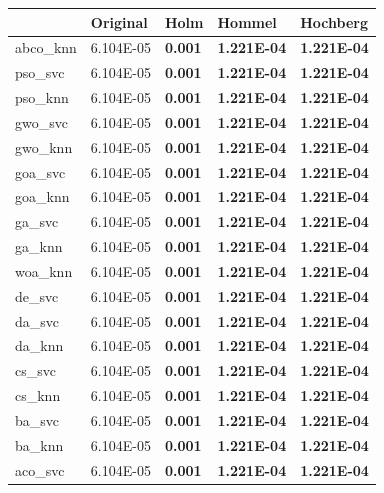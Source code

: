 \begin{table}[htb]
    \centering
    \begin{tabular}{lllll}
        \toprule
        {}        & Original  & Holm           & Hommel             & Hochberg           \\
        \midrule
        abco\_knn & 6.104E-05 & \textbf{0.001} & \textbf{1.221E-04} & \textbf{1.221E-04} \\
        pso\_svc  & 6.104E-05 & \textbf{0.001} & \textbf{1.221E-04} & \textbf{1.221E-04} \\
        pso\_knn  & 6.104E-05 & \textbf{0.001} & \textbf{1.221E-04} & \textbf{1.221E-04} \\
        gwo\_svc  & 6.104E-05 & \textbf{0.001} & \textbf{1.221E-04} & \textbf{1.221E-04} \\
        gwo\_knn  & 6.104E-05 & \textbf{0.001} & \textbf{1.221E-04} & \textbf{1.221E-04} \\
        goa\_svc  & 6.104E-05 & \textbf{0.001} & \textbf{1.221E-04} & \textbf{1.221E-04} \\
        goa\_knn  & 6.104E-05 & \textbf{0.001} & \textbf{1.221E-04} & \textbf{1.221E-04} \\
        ga\_svc   & 6.104E-05 & \textbf{0.001} & \textbf{1.221E-04} & \textbf{1.221E-04} \\
        ga\_knn   & 6.104E-05 & \textbf{0.001} & \textbf{1.221E-04} & \textbf{1.221E-04} \\
        woa\_knn  & 6.104E-05 & \textbf{0.001} & \textbf{1.221E-04} & \textbf{1.221E-04} \\
        de\_svc   & 6.104E-05 & \textbf{0.001} & \textbf{1.221E-04} & \textbf{1.221E-04} \\
        da\_svc   & 6.104E-05 & \textbf{0.001} & \textbf{1.221E-04} & \textbf{1.221E-04} \\
        da\_knn   & 6.104E-05 & \textbf{0.001} & \textbf{1.221E-04} & \textbf{1.221E-04} \\
        cs\_svc   & 6.104E-05 & \textbf{0.001} & \textbf{1.221E-04} & \textbf{1.221E-04} \\
        cs\_knn   & 6.104E-05 & \textbf{0.001} & \textbf{1.221E-04} & \textbf{1.221E-04} \\
        ba\_svc   & 6.104E-05 & \textbf{0.001} & \textbf{1.221E-04} & \textbf{1.221E-04} \\
        ba\_knn   & 6.104E-05 & \textbf{0.001} & \textbf{1.221E-04} & \textbf{1.221E-04} \\
        aco\_svc  & 6.104E-05 & \textbf{0.001} & \textbf{1.221E-04} & \textbf{1.221E-04} \\

\end{tabular}
\end{table}
